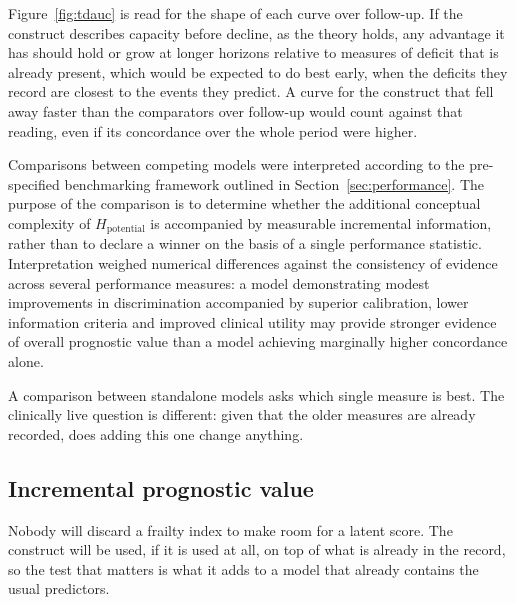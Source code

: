 Figure~\ref{fig:tdauc} is read for the shape of each curve over follow-up. If the construct describes capacity before decline, as the theory holds, any advantage it has should hold or grow at longer horizons relative to measures of deficit that is already present, which would be expected to do best early, when the deficits they record are closest to the events they predict. A curve for the construct that fell away faster than the comparators over follow-up would count against that reading, even if its concordance over the whole period were higher.

Comparisons between competing models were interpreted according to the pre-specified benchmarking framework outlined in Section~\ref{sec:performance}. The purpose of the comparison is to determine whether the additional conceptual complexity of $H_{\text{potential}}$ is accompanied by measurable incremental information, rather than to declare a winner on the basis of a single performance statistic. Interpretation weighed numerical differences against the consistency of evidence across several performance measures: a model demonstrating modest improvements in discrimination accompanied by superior calibration, lower information criteria and improved clinical utility may provide stronger evidence of overall prognostic value than a model achieving marginally higher concordance alone.

\medskip
{}

A comparison between standalone models asks which single measure is best. The clinically live question is different: given that the older measures are already recorded, does adding this one change anything.

\subsection{Incremental prognostic value}
\label{sec:prog-increment}

\noindent Nobody will discard a frailty index to make room for a latent score. The construct will be used, if it is used at all, on top of what is already in the record, so the test that matters is what it adds to a model that already contains the usual predictors.

